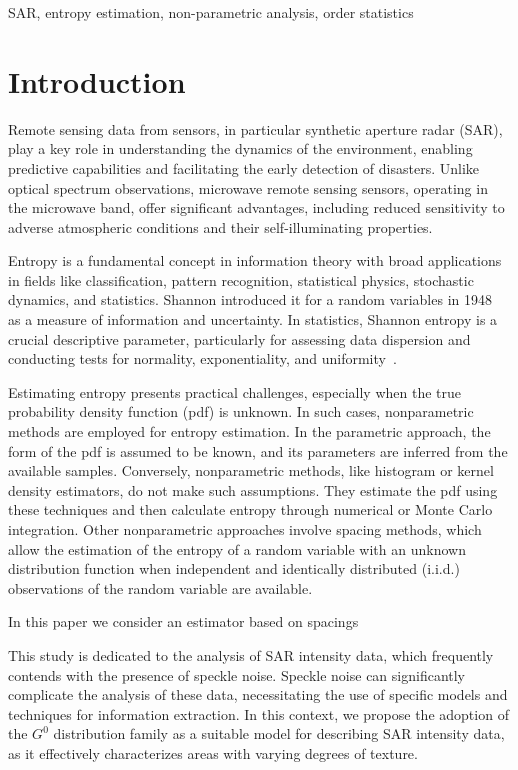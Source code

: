 \documentclass[conference]{IEEEtran}
\begin{document}
\begin{IEEEkeywords}
SAR, entropy estimation, non-parametric analysis, order statistics
\end{IEEEkeywords}

\section{Introduction}\label{sec_01}

Remote sensing data from sensors, in particular synthetic aperture radar (SAR), play a key role in understanding the dynamics of the environment, enabling predictive capabilities and facilitating the early detection of disasters. Unlike optical spectrum observations, microwave remote sensing sensors, operating in the microwave band, offer significant advantages, including reduced sensitivity to adverse atmospheric conditions and their self-illuminating properties.

Entropy is a fundamental concept in information theory with broad applications in fields like classification, pattern recognition, statistical physics, stochastic dynamics, and statistics.
Shannon introduced it for a random variables in 1948~\cite{Shannon1948} as a measure of information and uncertainty. 
In statistics, Shannon entropy is a crucial descriptive parameter, particularly for assessing data dispersion and conducting tests for normality, exponentiality, and uniformity~\cite{Wieczorkowski1999}.

Estimating entropy presents practical challenges, especially when the true probability density function (pdf) is unknown.
In such cases, nonparametric methods are employed for entropy estimation. 
In the parametric approach, the form of the pdf is assumed to be known, and its parameters are inferred from the available samples. 
Conversely, nonparametric methods, like histogram or kernel density estimators, do not make such assumptions. 
They estimate the pdf using these techniques and then calculate entropy through numerical or Monte Carlo integration. 
Other nonparametric approaches involve spacing methods, which allow the estimation of the entropy of a random variable with an unknown distribution function when independent and identically distributed (i.i.d.) observations of the random variable are available.

In this paper we consider an estimator based on spacings



This study is dedicated to the analysis of SAR intensity data, which frequently contends with the presence of speckle noise. Speckle noise can significantly complicate the analysis of these data, necessitating the use of specific models and techniques for information extraction. In this context, we propose the adoption of the $G^0$ distribution family as a suitable model for describing SAR intensity data, as it effectively characterizes areas with varying degrees of texture.
\end{document}

